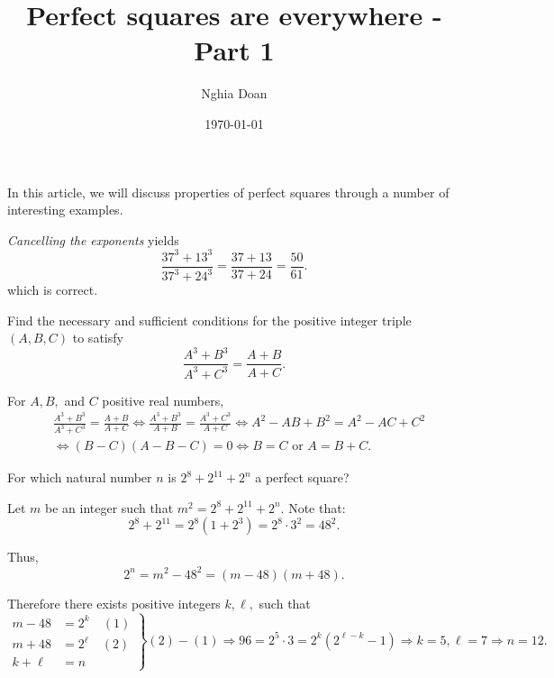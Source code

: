 \documentclass{article}
\title{Perfect squares are everywhere - Part 1}
\author{Nghia Doan}
\date{\today}
\begin{document}
\maketitle

In this article, we will discuss properties of perfect squares through a number of interesting examples.

\begin{example*}[Example 1]
    \textit{Cancelling the exponents} yields
    \[
        \frac{37^3+13^3}{37^3+24^3} = \frac{37+13}{37+24} = \frac{50}{61}.
    \]
    which is correct.
    
    Find the necessary and sufficient conditions for the positive integer triple $(A,B,C)$ to satisfy
    \[
        \frac{A^3+B^3}{A^3+C^3} = \frac{A+B}{A+C}.
    \]
\end{example*}

\begin{soln}
    For $A, B,$ and $C$ positive real numbers,
    \[
        \begin{aligned}
            &\frac{A^3+B^3}{A^3+C^3} = \frac{A+B}{A+C} \Leftrightarrow \frac{A^3+B^3}{A+B} = \frac{A^3+C^3}{A+C}
            \Leftrightarrow A^2 - AB + B^2 = A^2 - AC + C^2\\
            &\Leftrightarrow (B-C)(A-B-C) = 0 \Leftrightarrow \boxed{B=C} \text{\ or\ } \boxed{A = B+C.}
        \end{aligned}
    \]
\end{soln}

\begin{example*}[Example 2]
    For which natural number $n$ is $2^8 + 2^{11} + 2^n$ a perfect square?
\end{example*}

\begin{soln}
    Let $m$ be an integer such that $m^2 = 2^8 + 2^{11} + 2^n.$ Note that:
    \[
        2^8 + 2^{11} = 2^8(1+2^3) = 2^8 \cdot 3^2 = 48^2.
    \]

    Thus,
    \[
        2^n = m^2 - 48^2 = (m-48)(m+48).
    \]

    Therefore there exists positive integers $k, \ell,$ such that
    \[
        \left.
            \begin{aligned}
                m-48 &= 2^k \quad (1)\\
                m+48 &= 2^{\ell} \quad (2)\\
                k + \ell &= n
            \end{aligned}
        \right\}
        (2) - (1) \Rightarrow 96 = 2^5 \cdot 3 = 2^k(2^{\ell-k}-1)
        \Rightarrow k = 5, \ell = 7 \Rightarrow \boxed{n = 12.}
    \]
\end{soln}
\end{document}
